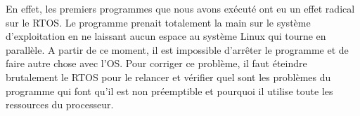 En effet, les premiers programmes que nous avons exécuté ont eu un effet radical sur le RTOS. Le programme prenait totalement la main sur le système d'exploitation en ne laissant aucun espace au système Linux qui tourne en parallèle. A partir de ce moment, il est impossible d'arrêter le programme et de faire autre chose avec l'OS. Pour corriger ce problème, il faut éteindre brutalement le RTOS pour le relancer et vérifier quel sont les problèmes du programme qui font qu'il est non préemptible et pourquoi il utilise toute les ressources du processeur.